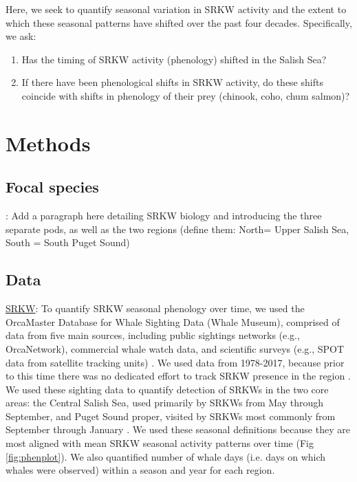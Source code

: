 \documentclass{article}
\begin{document}
\par Here, we seek to quantify seasonal variation in SRKW activity and the extent to which these seasonal patterns have shifted over the past four decades.  %
Specifically, we ask:
\begin{enumerate}
\item Has the timing of SRKW activity (phenology) shifted in the Salish Sea? 
\item If there have been phenological shifts in SRKW activity, do these shifts coincide with shifts in phenology of their prey (chinook, coho, chum salmon)?
\end{enumerate}

\section* {Methods}
\subsection*{Focal species}:
Add a paragraph here detailing SRKW biology and introducing the three separate pods, as well as the two regions (define them: North= Upper Salish Sea, South = South Puget Sound)

\subsection* {Data}
\par \underline{SRKW}: To quantify SRKW seasonal phenology over time, we used the OrcaMaster Database for Whale Sighting Data (Whale Museum), comprised of data from five main sources, including public sightings networks (e.g., OrcaNetwork), commercial whale watch data, and scientific surveys (e.g., SPOT data from satellite tracking units) \citep{olson2018}. We used data from 1978-2017, because prior to this time there was no dedicated effort to track SRKW presence in the region \citep{olson2018}. We used these sighting data to quantify %
detection of SRKWs in the two core areas: the Central Salish Sea, used primarily by SRKWs from May through September, and Puget Sound proper, visited by SRKWs most commonly from September through January \citep{olson2018}. We used these seasonal definitions because they are most aligned with mean SRKW seasonal activity patterns over time (Fig \ref{fig:phenplot}).  We also quantified number of whale days (i.e. days on which whales were observed) within a season and year for each region. 
\end{document}
